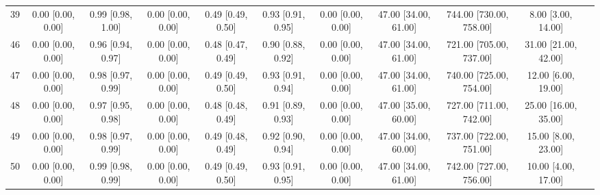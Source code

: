 \documentclass[8pt]{article}
\begin{document}
\begin{center}
\begin{footnotesize}
\begin{longtable}{|ccccccccccc|}
 39 &  0.00 [0.00, 0.00] &  0.99 [0.98, 1.00] &  0.00 [0.00, 0.00] &  0.49 [0.49, 0.50] &  0.93 [0.91, 0.95] &     0.00 [0.00, 0.00] &  47.00 [34.00, 61.00] &  744.00 [730.00, 758.00] &       8.00 [3.00, 14.00] \\
 46 &  0.00 [0.00, 0.00] &  0.96 [0.94, 0.97] &  0.00 [0.00, 0.00] &  0.48 [0.47, 0.49] &  0.90 [0.88, 0.92] &     0.00 [0.00, 0.00] &  47.00 [34.00, 61.00] &  721.00 [705.00, 737.00] &     31.00 [21.00, 42.00] \\
 47 &  0.00 [0.00, 0.00] &  0.98 [0.97, 0.99] &  0.00 [0.00, 0.00] &  0.49 [0.49, 0.50] &  0.93 [0.91, 0.94] &     0.00 [0.00, 0.00] &  47.00 [34.00, 61.00] &  740.00 [725.00, 754.00] &      12.00 [6.00, 19.00] \\
 48 &  0.00 [0.00, 0.00] &  0.97 [0.95, 0.98] &  0.00 [0.00, 0.00] &  0.48 [0.48, 0.49] &  0.91 [0.89, 0.93] &     0.00 [0.00, 0.00] &  47.00 [35.00, 60.00] &  727.00 [711.00, 742.00] &     25.00 [16.00, 35.00] \\
 49 &  0.00 [0.00, 0.00] &  0.98 [0.97, 0.99] &  0.00 [0.00, 0.00] &  0.49 [0.48, 0.49] &  0.92 [0.90, 0.94] &     0.00 [0.00, 0.00] &  47.00 [34.00, 60.00] &  737.00 [722.00, 751.00] &      15.00 [8.00, 23.00] \\
 50 &  0.00 [0.00, 0.00] &  0.99 [0.98, 0.99] &  0.00 [0.00, 0.00] &  0.49 [0.49, 0.50] &  0.93 [0.91, 0.95] &     0.00 [0.00, 0.00] &  47.00 [34.00, 61.00] &  742.00 [727.00, 756.00] &      10.00 [4.00, 17.00] \\
\end{longtable}
\end{footnotesize}
\end{center}
\end{document}
